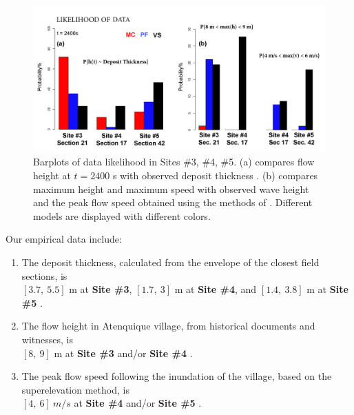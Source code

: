\documentclass[nhess, manuscript]{copernicus}
\begin{document}
\begin{figure}[H]
\centering
\includegraphics[width=1\textwidth]{Fig10.png}
\caption{Barplots of data likelihood in Sites \#3, \#4, \#5. (a) compares flow height at $t=2400$ s with observed deposit thickness \citep{Saucedo2008}. (b) compares maximum height and maximum speed with observed wave height \citep{PonceSegura1983} and the peak flow speed obtained using the methods of \cite{Pierson1985}. Different models are displayed with different colors.}
\label{Fig10}
\end{figure}

Our empirical data include:
\begin{enumerate}
\item The deposit thickness, calculated from the envelope of the closest field sections, is \\ $[3.7,\ 5.5]$ m at \textbf{Site \#3}, $[1.7,\ 3]$ m at \textbf{Site \#4}, and $[1.4,\ 3.8]$ m at \textbf{Site \#5} \citep{Saucedo2008}.
\item The flow height in Atenquique village, from historical documents and witnesses, is \\$[8,\ 9]$ m at \textbf{Site \#3} and/or \textbf{Site \#4} \citep{PonceSegura1983, Saucedo2008}.
\item The peak flow speed following the inundation of the village, based on the superelevation method, is \\$[4,\ 6]\ m/s$ at \textbf{Site \#4} and/or \textbf{Site \#5} \citep{Pierson1985, Saucedo2008}.
\end{enumerate}
\end{document}
